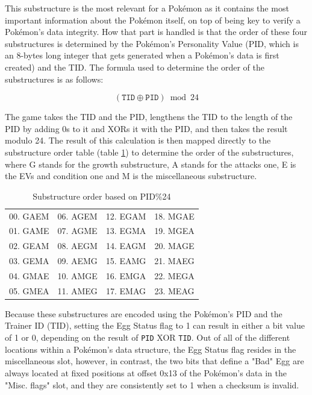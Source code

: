 \documentclass[a4paper]{usiinfbachelorproject}
\begin{document}
This substructure is the most relevant for a Pokémon as it contains the most important information about the Pokémon itself, on top of being key to verify a Pokémon's data integrity. How that part is handled is that the order of these four substructures is determined by the Pokémon's Personality Value (PID, which is an 8-bytes long integer that gets generated when a Pokémon's data is first created) and the TID. The formula used to determine the order of the substructures is as follows:

\begin{equation}
	\left( \texttt{TID} \oplus \texttt{PID} \right) \bmod 24
	\label{eq:substructure_order_formula}
\end{equation}

The game takes the TID and the PID, lengthens the TID to the length of the PID by adding 0s to it and XORs it with the PID, and then takes the result modulo 24. The result of this calculation is then mapped directly to the substructure order table (table \ref{tab:substructure-order}) to determine the order of the substructures, where G stands for the growth substructure, A stands for the attacks one, E is the EVs and condition one and M is the miscellaneous substructure.

\begin{table}[h!]
	\centering
	\begin{tabular}{cccc}
		\toprule
		00. GAEM & 06. AGEM & 12. EGAM & 18. MGAE \\
		01. GAME & 07. AGME & 13. EGMA & 19. MGEA \\
		02. GEAM & 08. AEGM & 14. EAGM & 20. MAGE \\
		03. GEMA & 09. AEMG & 15. EAMG & 21. MAEG \\
		04. GMAE & 10. AMGE & 16. EMGA & 22. MEGA \\
		05. GMEA & 11. AMEG & 17. EMAG & 23. MEAG \\
		\bottomrule
	\end{tabular}
	\caption{Substructure order based on PID\%24}
	\label{tab:substructure-order}
\end{table}


Because these substructures are encoded using the Pokémon’s PID and the Trainer ID (TID), setting the Egg Status flag to 1 can result in either a bit value of 1 or 0, depending on the result of \texttt{PID} XOR \texttt{TID}. Out of all of the different locations within a Pokémon's data structure, the Egg Status flag resides in the miscellaneous slot, however, in contrast, the two bits that define a "Bad" Egg are always located at fixed positions at offset 0x13 of the Pokémon's data in the "Misc. flags" slot, and they are consistently set to 1 when a checksum is invalid.
\end{document}

